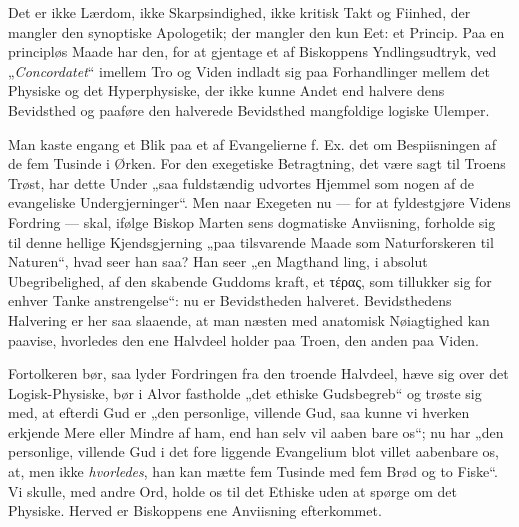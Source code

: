 \documentclass[12pt]{book}
\newcommand{\opage}[1]{\marginnote{\footnotesize\textit{[#1]}}}
\begin{document}
Det er ikke Lærdom, ikke Skarpsindighed, ikke kritisk
Takt og Fiinhed, der mangler den synoptiske Apologetik; der
mangler den kun Eet: et Princip. Paa en principløs Maade
har den, for at gjentage et af Biskoppens Yndlingsudtryk,
ved „\emph{Concordatet}“ imellem Tro og Viden indladt sig paa
Forhandlinger mellem det Physiske og det Hyperphysiske, der
ikke kunne Andet end halvere dens Bevidsthed og paaføre den
halverede Bevidsthed mangfoldige logiske Ulemper.

Man kaste engang et Blik paa et af Evangelierne f. Ex.
det om Bespiisningen af de fem Tusinde i Ørken. For den
exegetiske Betragtning, det være sagt til Troens Trøst, har dette
Under „saa fuldstændig udvortes Hjemmel som nogen af de
evangeliske Undergjerninger“. Men naar Exegeten nu --- for at
fyldestgjøre Videns Fordring --- skal, ifølge Biskop Marten\-%
sens dogmatiske Anviisning, forholde sig til denne hellige
Kjendsgjerning „paa tilsvarende Maade som Naturforskeren
til Naturen“, hvad seer han saa? Han seer „en Magthand\-%
ling, i absolut Ubegribelighed, af den skabende Guddoms\-%
kraft, et τέρας, som tillukker sig for enhver Tanke\-%
anstrengelse“: nu er Bevidstheden halveret. Bevidsthedens
Halvering er her saa slaaende, at man næsten med anatomisk
Nøiagtighed kan paavise, hvorledes den ene Halvdeel holder
paa Troen, den anden paa Viden.

Fortolkeren bør, saa lyder Fordringen fra den troende
Halvdeel, hæve sig over det Logisk-Physiske, bør i Alvor
fastholde „det ethiske Gudsbegreb“ og trøste sig med, at efterdi
Gud er „den personlige, villende Gud, saa kunne vi hverken
\opage{70}\setcounter{footnote}{0}%
erkjende Mere eller Mindre af ham, end han selv vil aaben\-%
bare os“; nu har „den personlige, villende Gud i det fore\-%
liggende Evangelium blot villet aabenbare os, at, men ikke
\emph{hvorledes}, han kan mætte fem Tusinde med fem Brød og
to Fiske“. Vi skulle, med andre Ord, holde os til det
Ethiske uden at spørge om det Physiske. Herved er Biskoppens
ene Anviisning efterkommet.
\end{document}
